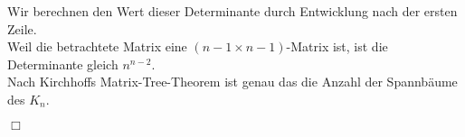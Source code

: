 Wir berechnen den Wert dieser Determinante durch Entwicklung nach der ersten Zeile. \\
Weil die betrachtete Matrix eine $(n-1 \times n-1)$-Matrix ist, ist die Determinante gleich $n^{n-2}$.\\
Nach Kirchhoffs Matrix-Tree-Theorem ist genau das die Anzahl der Spannbäume des $K_n$.
\begin{flushright} $\Box$ \end{flushright} 
